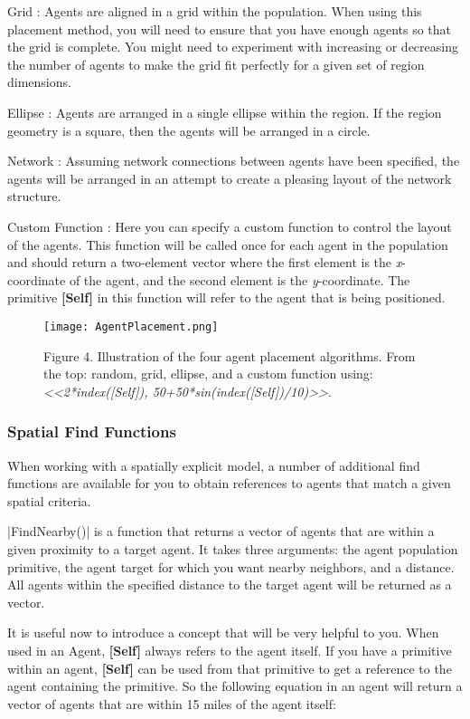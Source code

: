 \documentclass[]{memoir}
\makeatletter
\newcommand{\FunctionTok}[1]{\textcolor[rgb]{0.02,0.16,0.49}{{#1}}}
\newcommand{\NormalTok}[1]{{#1}}
\def\maxwidth{\ifdim\Gin@nat@width>\linewidth\linewidth
\else\Gin@nat@width\fi}
\let\Oldincludegraphics\includegraphics
\renewcommand{\includegraphics}[1]{\Oldincludegraphics[width=\maxwidth]{#1}}
\newcommand{\p}[1]{\textbf{{[}#1{]}}}
\makeatother
\begin{document}
Grid : Agents are aligned in a grid within the population. When using
this placement method, you will need to ensure that you have enough
agents so that the grid is complete. You might need to experiment with
increasing or decreasing the number of agents to make the grid fit
perfectly for a given set of region dimensions.

Ellipse : Agents are arranged in a single ellipse within the region. If
the region geometry is a square, then the agents will be arranged in a
circle.

Network : Assuming network connections between agents have been
specified, the agents will be arranged in an attempt to create a
pleasing layout of the network structure.

Custom Function : Here you can specify a custom function to control the
layout of the agents. This function will be called once for each agent
in the population and should return a two-element vector where the first
element is the \emph{x}-coordinate of the agent, and the second element
is the \emph{y}-coordinate. The primitive \p{Self} in this function will
refer to the agent that is being positioned.

\begin{figure}[htbp]
\centering
\texttt{[image: AgentPlacement.png]}
\caption{Figure 4. Illustration of the four agent placement algorithms.
From the top: random, grid, ellipse, and a custom function using:
\emph{\textless{}\textless{}2*index({[}Self{]}),
50+50*sin(index({[}Self{]})/10)\textgreater{}\textgreater{}}.}
\end{figure}

\subsubsection{Spatial Find Functions}

When working with a spatially explicit model, a number of additional
find functions are available for you to obtain references to agents that
match a given spatial criteria.

|\FunctionTok{FindNearby}\NormalTok{()}| is a function that returns a
vector of agents that are within a given proximity to a target agent. It
takes three arguments: the agent population primitive, the agent target
for which you want nearby neighbors, and a distance. All agents within
the specified distance to the target agent will be returned as a vector.

It is useful now to introduce a concept that will be very helpful to
you. When used in an Agent, \p{Self} always refers to the agent itself.
If you have a primitive within an agent, \p{Self} can be used from that
primitive to get a reference to the agent containing the primitive. So
the following equation in an agent will return a vector of agents that
are within 15 miles of the agent itself:
\end{document}
